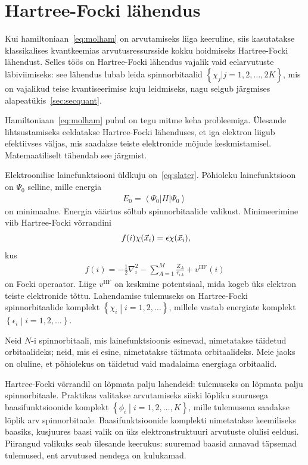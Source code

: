 \documentclass[12pt]{report}
\def\cparen#1{\left\{#1\right\}}
\def\bra#1{\left<#1\right|}
\def\ket#1{\left|#1\right>}
\begin{document}
\section{Hartree-Focki lähendus}\label{sec:hartfock}

Kui hamiltoniaan~\eqref{eq:molham} on arvutamiseks liiga keeruline, siis kasutatakse klassikalises kvantkeemias arvutusressursside kokku hoidmiseks Hartree-Focki lähendust.
Selles töös on Hartree-Focki lähendus vajalik vaid eelarvutuste läbiviimiseks: see lähendus lubab leida spinnorbitaalid \(\cparen{\chi_j | j=1, 2, \ldots, 2K}\), mis on vajalikud teise kvantiseerimise kuju leidmiseks, nagu selgub järgmises alapeatükis~\ref{sec:secquant}.

Hamiltoniaan~\ref{eq:molham} puhul on tegu mitme keha probleemiga.
Ülesande lihtsustamiseks eeldatakse Hartree-Focki lähenduses, et iga elektron liigub efektiivses väljas, mis saadakse teiste elektronide mõjude keskmistamisel.
Matemaatiliselt tähendab see järgmist.

Elektroonilise lainefunktsiooni üldkuju on~\eqref{eq:slater}.
Põhioleku lainefunktsioon on \(\Psi_0\) selline, mille energia
\begin{align}
    E_0 = \bra{\Psi_0} H \ket{\Psi_0}
\end{align}
on minimaalne.
Energia väärtus sõltub spinnorbitaalide valikust.
Minimeerimine viib Hartree-Focki võrrandini
\begin{align}
    f(i) \chi(\vec{x}_i) = \epsilon \chi(\vec{x}_i) \rlap{,}
\end{align}
kus
\begin{align}
  f(i) = -\frac{1}{2} \nabla_i^2 - \sum_{A = 1}^M \frac{Z_A}{r_{iA}} + v^\text{HF}(i)
\end{align}
on Focki operaator.
Liige \(v^\text{HF}\) on keskmine potentsiaal, mida kogeb üks elektron teiste elektronide tõttu.
Lahendamise tulemuseks on Hartree-Focki spinnorbitaalide komplekt \(\cparen{\chi_i \middle| i = 1, 2, \ldots}\), millele vastab energiate komplekt \(\cparen{\epsilon_i \middle| i = 1, 2, \ldots}\).

Neid \(N\)-i spinnorbitaali, mis lainefunktsioonis esinevad, nimetatakse täidetud orbitaalideks; neid, mis ei esine, nimetatakse täitmata orbitaalideks.
Meie jaoks on oluline, et põhiolekus on täidetud vaid madalaima energiaga orbitaalid.

Hartree-Focki võrrandil on lõpmata palju lahendeid: tulemuseks on lõpmata palju spinnorbitaale.
Praktikas valitakse arvutamiseks siiski lõpliku suurusega baasifunktsioonide komplekt $\cparen{\phi_i \middle| i = 1, 2, \ldots, K}$, mille tulemusena saadakse lõplik arv spinnorbitaale.
Baasifunktsioonide komplekti nimetatakse keemiliseks baasiks, kusjuures baasi valik on üks elektronstruktuuri arvutuste olulisi eeldusi.
Piirangud valikuks seab ülesande keerukus: suuremad baasid annavad täpsemad tulemused, ent arvutused nendega on kulukamad.
\end{document}
